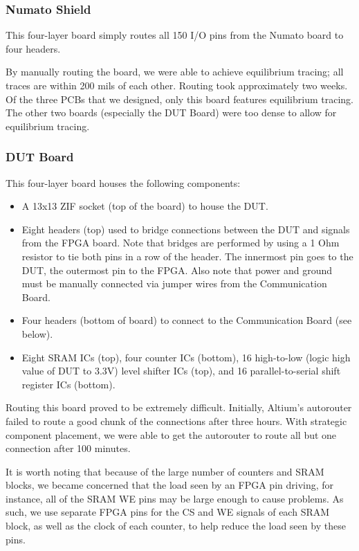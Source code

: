 \subsubsection{Numato Shield}
This four-layer board simply routes all 150 I/O pins from the Numato board to four headers. 

By manually routing the board, we were able to achieve equilibrium tracing; all traces are within 200 mils of each other. Routing took approximately two weeks. Of the three PCBs that we designed, only this board features equilibrium tracing. The other two boards (especially the DUT Board) were too dense to allow for equilibrium tracing.

\subsubsection{DUT Board}
This four-layer board houses the following components: 
\begin{itemize}
\item A 13x13 ZIF socket (top of the board) to house the DUT.
\item Eight headers (top) used to bridge connections between the DUT and signals from the FPGA board. Note that bridges are performed by using a 1 Ohm resistor to tie both pins in a row of the header. The innermost pin goes to the DUT, the outermost pin to the FPGA. Also note that power and ground must be manually connected via jumper wires from the Communication Board.
\item Four headers (bottom of board) to connect to the Communication Board (see below).
\item Eight SRAM ICs (top), four counter ICs (bottom), 16 high-to-low (logic high value of DUT to 3.3V) level shifter ICs (top), and 16 parallel-to-serial shift register ICs (bottom). 
\end{itemize}

Routing this board proved to be extremely difficult. Initially, Altium's autorouter failed to route a good chunk of the connections after three hours. With strategic component placement, we were able to get the autorouter to route all but one connection after 100 minutes. 

It is worth noting that because of the large number of counters and SRAM blocks, we became concerned that the load seen by an FPGA pin driving, for instance, all of the SRAM WE pins may be large enough to cause problems. As such, we use separate FPGA pins for the CS and WE signals of each SRAM block, as well as the clock of each counter, to help reduce the load seen by these pins.

